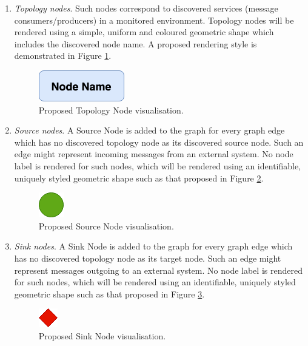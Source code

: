 \begin{enumerate}
	\item \textit{Topology nodes}. Such nodes correspond to discovered services (message consumers/producers) in a monitored environment. Topology nodes will be rendered using a simple, uniform and coloured geometric shape which includes the discovered node name. A proposed rendering style is demonstrated in Figure \ref{dashboard_node_high_level}.
	
	\begin{figure}[H]
		\centering  
		\includegraphics[scale=0.8]{figures/design/dashboard_node_high_level.png}
		\caption{Proposed Topology Node visualisation.}
		\label{dashboard_node_high_level}
	\end{figure}
	
	
	\item \textit{Source nodes}. A Source Node is added to the graph for every graph edge which has no discovered topology node as its discovered source node. Such an edge might represent incoming messages from an external system. No node label is rendered for such nodes, which will be rendered using an identifiable, uniquely styled geometric shape such as that proposed in Figure  \ref{dashboard_source_node_high_level}.
	
	\begin{figure}[H]
		\centering  
		\includegraphics[scale=0.8]{figures/design/dashboard_source_node_high_level.png}
		\caption{Proposed Source Node visualisation.}
		\label{dashboard_source_node_high_level}
	\end{figure}
	
	\item \textit{Sink nodes}. A Sink Node is added to the graph for every graph edge which has no discovered topology node as its target node. Such an edge might represent messages outgoing to an external system.  No node label is rendered for such nodes, which will be rendered using an identifiable, uniquely styled geometric shape such as that proposed in Figure  \ref{dashboard_sink_node_high_level}.
	
	\begin{figure}[H]
		\centering  
		\includegraphics{figures/design/dashboard_sink_node_high_level.png}
		\caption{Proposed Sink Node visualisation.}
		\label{dashboard_sink_node_high_level}
	\end{figure}
\end{enumerate}

